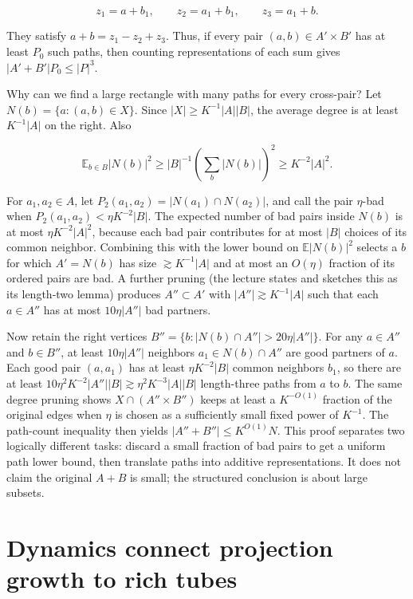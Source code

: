 \[z_1=a+b_1,\qquad z_2=a_1+b_1,\qquad z_3=a_1+b.\]

They satisfy \(a+b=z_1-z_2+z_3\). Thus, if every pair \((a,b)\in A'\times B'\) has at least \(P_0\) such paths, then counting representations of each sum gives \(|A'+B'|P_0\le |P|^3\).

Why can we find a large rectangle with many paths for every cross-pair? Let \(N(b)=\{a:(a,b)\in X\}\). Since \(|X|\ge K^{-1}|A||B|\), the average degree is at least \(K^{-1}|A|\) on the right. Also

\[\mathbb E_{b\in B}|N(b)|^2\ge |B|^{-1}\left(\sum_b|N(b)|\right)^2\ge K^{-2}|A|^2.\]

For \(a_1,a_2\in A\), let \(P_2(a_1,a_2)=|N(a_1)\cap N(a_2)|\), and call the pair \(\eta\)-bad when \(P_2(a_1,a_2)<\eta K^{-2}|B|\). The expected number of bad pairs inside \(N(b)\) is at most \(\eta K^{-2}|A|^2\), because each bad pair contributes for at most \(|B|\) choices of its common neighbor. Combining this with the lower bound on \(\mathbb E|N(b)|^2\) selects a \(b\) for which \(A'=N(b)\) has size \(\gtrsim K^{-1}|A|\) and at most an \(O(\eta)\) fraction of its ordered pairs are bad. A further pruning (the lecture states and sketches this as its length-two lemma) produces \(A''\subset A'\) with \(|A''|\gtrsim K^{-1}|A|\) such that each \(a\in A''\) has at most \(10\eta|A''|\) bad partners.

Now retain the right vertices \(B''=\{b:|N(b)\cap A''|>20\eta|A''|\}\). For any \(a\in A''\) and \(b\in B''\), at least \(10\eta|A''|\) neighbors \(a_1\in N(b)\cap A''\) are good partners of \(a\). Each good pair \((a,a_1)\) has at least \(\eta K^{-2}|B|\) common neighbors \(b_1\), so there are at least \(10\eta^2K^{-2}|A''||B|\gtrsim\eta^2K^{-3}|A||B|\) length-three paths from \(a\) to \(b\). The same degree pruning shows \(X\cap(A''\times B'')\) keeps at least a \(K^{-O(1)}\) fraction of the original edges when \(\eta\) is chosen as a sufficiently small fixed power of \(K^{-1}\). The path-count inequality then yields \(|A''+B''|\le K^{O(1)}N\). This proof separates two logically different tasks: discard a small fraction of bad pairs to get a uniform path lower bound, then translate paths into additive representations. It does not claim the original \(A+B\) is small; the structured conclusion is about large subsets.

\section{Dynamics connect projection growth to rich tubes}\label{04-visual-computing-ii-ch033-dynamics-connect-projection-growth-to-rich-tubes}

